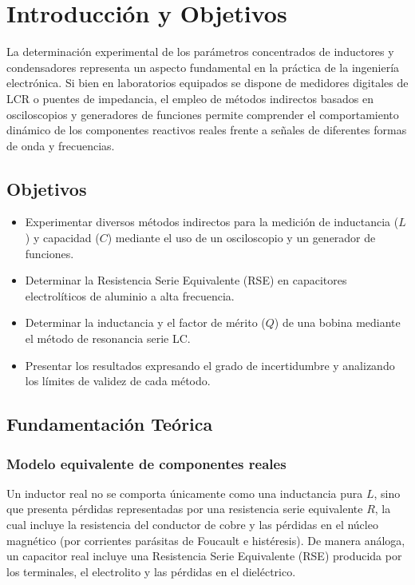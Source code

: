 \chapter{Introducción y Objetivos}

La determinación experimental de los parámetros concentrados de inductores y condensadores representa un aspecto
fundamental en la práctica de la ingeniería electrónica. Si bien en laboratorios equipados se dispone de medidores
digitales de LCR o puentes de impedancia, el empleo de métodos indirectos basados en osciloscopios y generadores de
funciones permite comprender el comportamiento dinámico de los componentes reactivos reales frente a señales de
diferentes formas de onda y frecuencias.

\section{Objetivos}
\begin{itemize}
    \item Experimentar diversos métodos indirectos para la medición de inductancia ($L$) y capacidad ($C$) mediante el
    uso de un osciloscopio y un generador de funciones.
    \item Determinar la Resistencia Serie Equivalente (RSE) en capacitores electrolíticos de aluminio a alta frecuencia.
    \item Determinar la inductancia y el factor de mérito ($Q$) de una bobina mediante el método de resonancia serie LC.
    \item Presentar los resultados expresando el grado de incertidumbre y analizando los límites de validez de cada método.
\end{itemize}

\section{Fundamentación Teórica}

\subsection{Modelo equivalente de componentes reales}
Un inductor real no se comporta únicamente como una inductancia pura $L$, sino que presenta pérdidas representadas por
una resistencia serie equivalente $R$, la cual incluye la resistencia del conductor de cobre y las pérdidas en el
núcleo magnético (por corrientes parásitas de Foucault e histéresis). De manera análoga, un capacitor real incluye
una Resistencia Serie Equivalente (RSE) producida por los terminales, el electrolito y las pérdidas en el dieléctrico.

